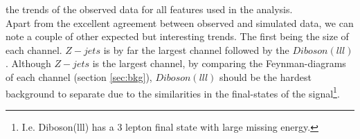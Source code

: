 the trends of the observed data for all features used in the analysis. 
\\
Apart from the excellent agreement between observed and simulated data, we can note a couple of other expected
but interesting trends. The first being the size of each channel. $Z-jets$ is by far the largest channel followed
by the $Diboson (lll)$. Although $Z-jets$ is the largest channel, by comparing the Feynman-diagrams of each channel
(section \ref{sec:bkg}), $Diboson(lll)$ should be the hardest background to separate due to the similarities in the 
final-states of the signal\footnote{I.e. Diboson(lll) has a 3 lepton final state with large missing energy.}. 
\begin{figure}
\end{figure}

